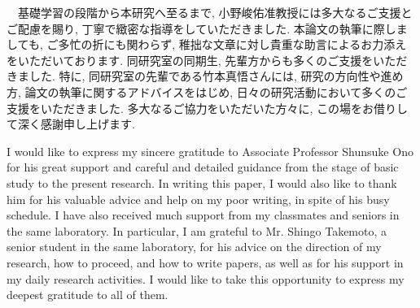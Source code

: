 　基礎学習の段階から本研究へ至るまで, 小野峻佑准教授には多大なるご支援とご配慮を賜り, 丁寧で緻密な指導をしていただきました.
本論文の執筆に際しましても, ご多忙の折にも関わらず, 稚拙な文章に対し貴重な助言によるお力添えをいただいております.
同研究室の同期生, 先輩方からも多くのご支援をいただきました.
特に, 同研究室の先輩である竹本真悟さんには, 研究の方向性や進め方, 論文の執筆に関するアドバイスをはじめ, 日々の研究活動において多くのご支援をいただきました.
多大なるご協力をいただいた方々に, この場をお借りして深く感謝申し上げます.

\vspace{5mm}

I would like to express my sincere gratitude to Associate Professor Shunsuke Ono for his great support and careful and detailed guidance from the stage of basic study to the present research.
In writing this paper, I would also like to thank him for his valuable advice and help on my poor writing, in spite of his busy schedule.
I have also received much support from my classmates and seniors in the same laboratory.
In particular, I am grateful to Mr. Shingo Takemoto, a senior student in the same laboratory, for his advice on the direction of my research, how to proceed, and how to write papers, as well as for his support in my daily research activities.
I would like to take this opportunity to express my deepest gratitude to all of them.
